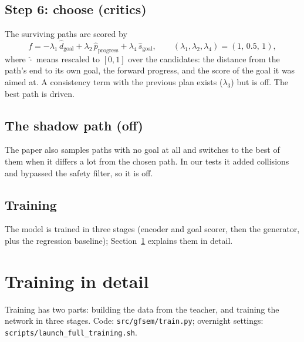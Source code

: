 \documentclass[11pt,a4paper]{article}
\newcommand{\code}[1]{\texttt{#1}}
\begin{document}
\subsection{Step 6: choose (critics)}
The surviving paths are scored by
\[
  f = -\lambda_1\,\widehat{d}_{\text{goal}} + \lambda_2\,\widehat{p}_{\text{progress}} + \lambda_4\,\widehat{s}_{\text{goal}},
  \qquad (\lambda_1,\lambda_2,\lambda_4) = (1,\,0.5,\,1),
\]
where $\widehat{\cdot}$ means rescaled to $[0,1]$ over the candidates: the distance from the path's end to
its own goal, the forward progress, and the score of the goal it was aimed at. A consistency term with the
previous plan exists ($\lambda_3$) but is off. The best path is driven.

\subsection{The shadow path (off)}
The paper also samples paths with no goal at all and switches to the best of them when it differs a lot
from the chosen path. In our tests it added collisions and bypassed the safety filter, so it is off.

\subsection{Training}
The model is trained in three stages (encoder and goal scorer, then the generator, plus the regression
baseline); Section~\ref{sec:training} explains them in detail.

\section{Training in detail}
\label{sec:training}

Training has two parts: building the data from the teacher, and training the network in three stages.
Code: \code{src/gfsem/train.py}; overnight settings: \code{scripts/launch\_full\_training.sh}.
\end{document}
